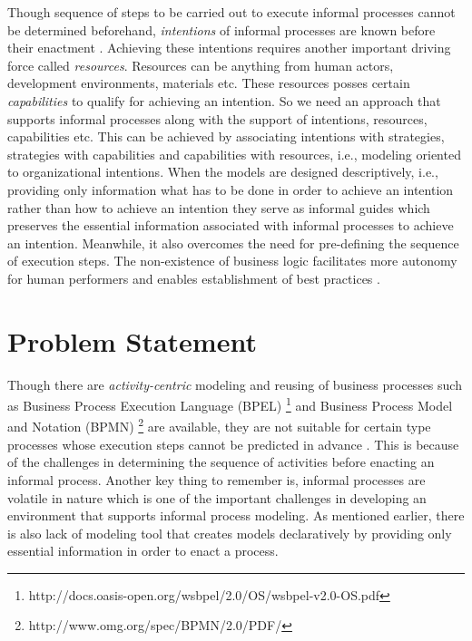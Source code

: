 Though sequence of steps to be carried out to execute informal processes cannot be determined beforehand, \textit{intentions} of informal processes are known before their enactment \cite{Sungur2015}. Achieving these intentions requires another important driving force called \textit{resources}. Resources can be anything from human actors, development environments, materials etc. These resources posses certain \textit{capabilities} to qualify for achieving an intention. So we need an approach that supports informal processes along with the support of intentions, resources, capabilities etc. This can be achieved by associating intentions with strategies, strategies with capabilities and capabilities with resources, i.e., modeling oriented to organizational intentions. When the models are designed descriptively, i.e., providing only information what has to be done in order to achieve an intention rather than how to achieve an intention they serve as informal guides which preserves the essential information associated with informal processes to achieve an intention. Meanwhile, it also overcomes the need for pre-defining the sequence of execution steps. The non-existence of business logic facilitates more autonomy for human performers and enables establishment of best practices \cite{Sungur2014a}.

\section{Problem Statement}
\label{sec:problemstatement}
Though there are \textit{activity-centric} modeling and reusing of business processes such as Business Process Execution Language (BPEL) \footnote{http://docs.oasis-open.org/wsbpel/2.0/OS/wsbpel-v2.0-OS.pdf} and Business Process Model and Notation (BPMN) \footnote{http://www.omg.org/spec/BPMN/2.0/PDF/} are available, they are not suitable for certain type processes whose execution steps cannot be predicted in advance \cite{Sungur2014a}. This is because of the challenges in determining the sequence of activities before enacting an informal process. Another key thing to remember is, informal processes are volatile in nature which is one of the important challenges in developing an environment that supports informal process modeling. As mentioned earlier, there is also lack of modeling tool that creates models declaratively by providing only essential information in order to enact a process. 

